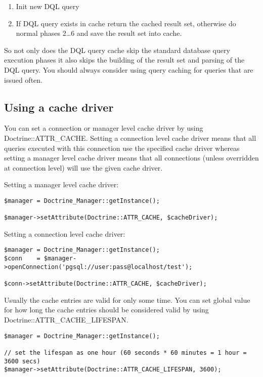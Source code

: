 \documentclass[11pt,a4paper]{report}
\begin{document}
\renewcommand{\labelenumi}{\arabic{enumi}}
\begin{enumerate}
\item{Init new DQL query}
\item{If DQL query exists in cache return the cached result set, otherwise do normal phases 2\ldots6 and save the result set into cache.}
\end{enumerate}
So not only does the DQL query cache skip the standard database query execution phases it also skips the building of the result set and parsing of the DQL query. You should always consider using query caching for queries that are issued often.

\subsection{Using a cache driver}
You can set a connection or manager level cache driver by using Doctrine::ATTR\_CACHE. Setting a connection level cache driver means that all queries executed with this connection use the specified cache driver whereas setting a manager level cache driver means that all connections (unless overridden at connection level) will use the given cache driver.

Setting a manager level cache driver:

\begin{verbatim}
$manager = Doctrine_Manager::getInstance();

$manager->setAttribute(Doctrine::ATTR_CACHE, $cacheDriver);
\end{verbatim}

Setting a connection level cache driver:

\begin{verbatim}
$manager = Doctrine_Manager::getInstance();
$conn    = $manager->openConnection('pgsql://user:pass@localhost/test');

$conn->setAttribute(Doctrine::ATTR_CACHE, $cacheDriver);
\end{verbatim}

Usually the cache entries are valid for only some time. You can set global value for how long the cache entries should be considered valid by using Doctrine::ATTR\_CACHE\_LIFESPAN.

\begin{verbatim}
$manager = Doctrine_Manager::getInstance();

// set the lifespan as one hour (60 seconds * 60 minutes = 1 hour = 3600 secs)
$manager->setAttribute(Doctrine::ATTR_CACHE_LIFESPAN, 3600);
\end{verbatim}
\end{document}
